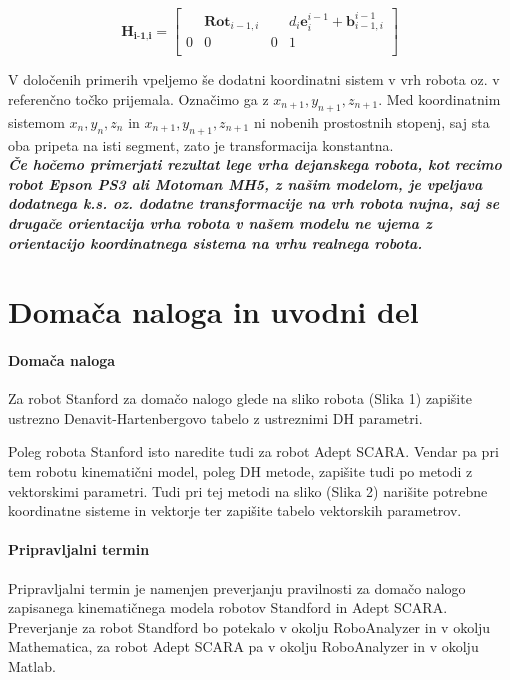 \begin{mdframed}[backgroundcolor=green!20, shadow=false,roundcorner=12pt,topline
=false, rightline=false,bottomline=false,leftline=false]
\begin{equation*}
    \textbf{H}_\textbf{{i-1,i}} =
    \begin{bmatrix}
     & \textbf{Rot}_{i-1,i} &  & d_i\textbf{e}_{i}^{i-1}+\textbf{b}_{i-1,i}^{i-1} \\%
    0              &   0                &    0  &   1     \\%
    \end{bmatrix}
\end{equation*}
\vspace{-0.2cm}

\end{mdframed}

V določenih primerih vpeljemo \v se dodatni koordinatni sistem v vrh
robota oz. v referenčno točko prijemala. Označimo ga z $x_{n+1},
y_{n+1}, z_{n+1}$. Med koordinatnim sistemom $x_{n}, y_{n}, z_{n}$
in $x_{n+1}, y_{n+1}, z_{n+1}$ ni nobenih prostostnih stopenj, saj
sta oba pripeta na isti segment, zato je
transformacija konstantna. \\
\textbf{\emph{\v Ce hočemo primerjati rezultat lege vrha dejanskega
robota, kot recimo robot Epson PS3 ali Motoman MH5, z na\v sim modelom, je vpeljava dodatnega k.s. oz.
dodatne transformacije na vrh robota nujna, saj se drugače
orientacija vrha robota v našem modelu ne ujema z orientacijo
koordinatnega sistema na vrhu realnega robota. }} \vspace{0.2cm}



\section{Domača naloga in uvodni del}

\paragraph{Domača naloga}
Za robot Stanford za domačo nalogo glede na sliko robota (Slika 1) zapišite ustrezno Denavit-Hartenbergovo tabelo z ustreznimi DH parametri.

Poleg robota Stanford isto naredite tudi za robot Adept SCARA. Vendar pa pri tem robotu kinematični model, poleg DH metode, zapišite tudi po metodi z vektorskimi parametri. Tudi pri tej metodi na sliko (Slika 2) narišite potrebne koordinatne sisteme in vektorje ter zapišite tabelo vektorskih parametrov.

\paragraph{Pripravljalni termin}
Pripravljalni termin je namenjen preverjanju pravilnosti za domačo nalogo zapisanega kinematičnega modela robotov Standford in Adept SCARA. Preverjanje za robot Standford bo potekalo v okolju RoboAnalyzer in v okolju Mathematica, za robot Adept SCARA pa v okolju RoboAnalyzer in v okolju Matlab.


